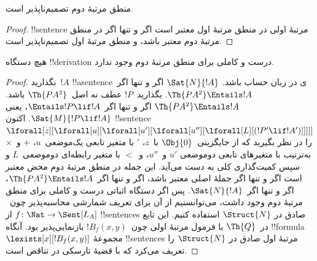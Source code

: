 \documentclass[../../../include/open-logic-section]{subfiles}
\begin{document}



\begin{thm}
منطق مرتبهٔ دوم تصمیم‌ناپذیر است.
\end{thm}

\begin{proof}
!!{sentence} مرتبهٔ اولی در منطق مرتبهٔ اول معتبر است اگر و تنها اگر در
منطق مرتبهٔ دوم معتبر باشد، و منطق مرتبهٔ اول تصمیم‌ناپذیر است.
\end{proof}

\begin{thm}
هیچ دستگاه !!{derivation} درست و کاملی برای منطق مرتبهٔ دوم وجود ندارد.
\end{thm}

\begin{proof}
بگذارید~$!A$ !!a{sentence}ی در زبان حساب باشد. $\Sat{N}{!A}$ اگر و تنها
اگر~$\Th{PA^2} \Entails !A$. بگذارید~$!P$ عطف نه اصل~$\Th{PA^2}$ باشد.
$\Th{PA^2} \Entails !A$ اگر و تنها اگر~$\Entails !P \lif !A$، یعنی
$\Sat{M}{!P \lif !A}$. اکنون !!{sentence}
$\lforall[z][\lforall[u][\lforall[u'][\lforall[u''][\lforall[L][(!P' \lif !A')]]]]]$ را در نظر
بگیرید که از جایگزینی~$\Obj{0}$ با~$z$، $\prime$ با متغیر تابعی
یک‌موضعی~$u$، $+$ و~$\times$ به‌ترتیب با متغیرهای تابعی دو‌موضعی
$u'$ و~$u''$، و~$<$ با متغیر رابطه‌ای دو‌موضعی~$L$ و سپس کمیت‌گذاری
کلی به دست می‌آید. این جمله در منطق مرتبهٔ دوم محض معتبر است اگر و تنها
اگر جملهٔ اصلی معتبر باشد، اگر و تنها اگر~$\Th{PA^2} \Entails !A$، اگر
و تنها اگر~$\Sat{N}{!A}$. پس اگر دستگاه اثباتی درست و کاملی برای منطق
مرتبهٔ دوم وجود داشت، می‌توانستیم از آن برای تعریف شمارشی محاسبه‌پذیر
  چون~$f\colon \Nat \to \Sent[L_A]$ از !!{sentence}s صادق در
  $\Struct{N}$ استفاده کنیم. این تابع در~$\Th{Q}$ با فرمول مرتبهٔ اولی
  چون~$!B_f(x, y)$ بازنمایی‌پذیر بود. آنگاه !!{formula}
$\lexists[x][!B_f(x, y)]$ مجموعهٔ !!{sentence}s مرتبهٔ اول صادق در
$\Struct{N}$ را تعریف می‌کرد که با قضیهٔ تارسکی در تناقض است.
\end{proof}
\end{document}
